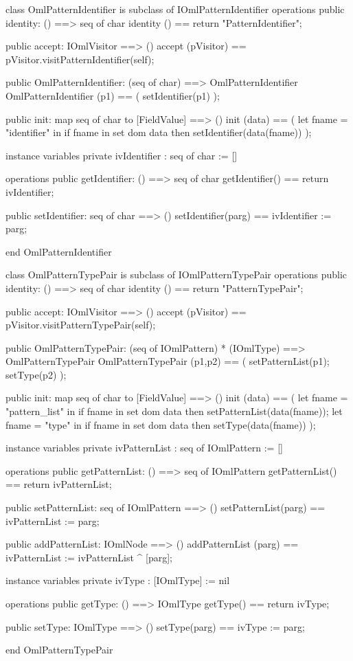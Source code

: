 \begin{vdm_al}
class OmlPatternIdentifier is subclass of IOmlPatternIdentifier
operations
  public identity: () ==> seq of char
  identity () == return "PatternIdentifier";

  public accept: IOmlVisitor ==> ()
  accept (pVisitor) == pVisitor.visitPatternIdentifier(self);

  public OmlPatternIdentifier:
      (seq of char) ==> OmlPatternIdentifier
  OmlPatternIdentifier (p1) == 
   ( setIdentifier(p1) );

  public init: map seq of char to [FieldValue] ==> ()
  init (data) ==
    ( let fname = "identifier" in
        if fname in set dom data
        then setIdentifier(data(fname)) );

instance variables
  private ivIdentifier : seq of char := []

operations
  public getIdentifier: () ==> seq of char
  getIdentifier() == return ivIdentifier;

  public setIdentifier: seq of char ==> ()
  setIdentifier(parg) == ivIdentifier := parg;

end OmlPatternIdentifier
\end{vdm_al}

\begin{vdm_al}
class OmlPatternTypePair is subclass of IOmlPatternTypePair
operations
  public identity: () ==> seq of char
  identity () == return "PatternTypePair";

  public accept: IOmlVisitor ==> ()
  accept (pVisitor) == pVisitor.visitPatternTypePair(self);

  public OmlPatternTypePair:
      (seq of IOmlPattern) *
      (IOmlType) ==> OmlPatternTypePair
  OmlPatternTypePair (p1,p2) == 
   ( setPatternList(p1);
     setType(p2) );

  public init: map seq of char to [FieldValue] ==> ()
  init (data) ==
    ( let fname = "pattern_list" in
        if fname in set dom data
        then setPatternList(data(fname));
      let fname = "type" in
        if fname in set dom data
        then setType(data(fname)) );

instance variables
  private ivPatternList : seq of IOmlPattern := []

operations
  public getPatternList: () ==> seq of IOmlPattern
  getPatternList() == return ivPatternList;

  public setPatternList: seq of IOmlPattern ==> ()
  setPatternList(parg) == ivPatternList := parg;

  public addPatternList: IOmlNode ==> ()
  addPatternList (parg) == ivPatternList := ivPatternList ^ [parg];

instance variables
  private ivType : [IOmlType] := nil

operations
  public getType: () ==> IOmlType
  getType() == return ivType;

  public setType: IOmlType ==> ()
  setType(parg) == ivType := parg;

end OmlPatternTypePair
\end{vdm_al}


